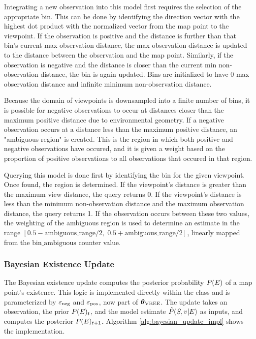 Integrating a new observation into this model first requires the selection of the appropriate bin. This can be done by identifying the direction vector with the highest dot product with the normalized vector from the map point to the viewpoint. If the observation is positive and the distance is further than that bin's current max observation distance, the max observation distance is updated to the distance between the observation and the map point. Similarly, if the observation is negative and the distance is closer than the current min non-observation distance, the bin is again updated. Bins are initialized to have 0 max observation distance and infinite minimum non-observation distance.

Because the domain of viewpoints is downsampled into a finite number of bins, it is possible for negative observations to occur at distances closer than the maximum positive distance due to environmental geometry. If a negative observation occurs at a distance less than the maximum positive distance, an "ambiguous region" is created. This is the region in which both positive and negative observations have occured, and it is given a weight based on the proportion of positive observations to all observations that occured in that region.

Querying this model is done first by identifying the bin for the given viewpoint. Once found, the region is determined. If the viewpoint's distance is greater than the maximum view distance, the query returns 0. If the viewpoint's distance is less than the minimum non-observation distance and the maximum observation distance, the query returns 1. If the observation occurs between these two values, the weighting of the ambiguous region is used to determine an estimate in the range $[0.5 - \text{ambiguous\_range}/2,\; 0.5 + \text{ambiguous\_range}/2]$, linearly mapped from the $\text{bin\_ambiguous}$ counter value.

\subsubsection{Bayesian Existence Update}
\label{sec:existence_confidence}

The Bayesian existence update computes the posterior probability $P(E)$ of a map point's existence. This logic is implemented directly within the \vbee{} class and is parameterized by $\varepsilon_{\text{neg}}$ and $\varepsilon_{\text{pos}}$, now part of $\boldsymbol{\theta}_{\text{VBEE}}$. The update takes an observation, the prior $P(E)_t$, and the model estimate $\hat{P}(S,v|E)$ as inputs, and computes the posterior $P(E)_{t+1}$. Algorithm \ref{alg:bayesian_update_impl} shows the implementation.

